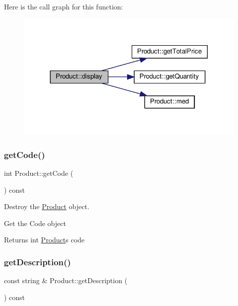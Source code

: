 Here is the call graph for this function\+:\nopagebreak
\begin{figure}[H]
\begin{center}
\leavevmode
\includegraphics[width=317pt]{classProduct_a2f411b12652a6b7b6194fcdbab3a1fb3_cgraph}
\end{center}
\end{figure}
\mbox{\label{classProduct_ada9a32ed7891875b3ccd8e064aad6492}} 
\subsubsection{\texorpdfstring{get\+Code()}{getCode()}}
{\footnotesize\ttfamily int Product\+::get\+Code (\begin{DoxyParamCaption}{ }\end{DoxyParamCaption}) const}



Destroy the \hyperlink{classProduct}{Product} object. 

Get the Code object

\begin{DoxyReturn}{Returns}
int \hyperlink{classProduct}{Product}\textquotesingle{}s code 
\end{DoxyReturn}
\mbox{\label{classProduct_afffde8c14c3bca709543cea274d67e7c}} 
\subsubsection{\texorpdfstring{get\+Description()}{getDescription()}}
{\footnotesize\ttfamily const string \& Product\+::get\+Description (\begin{DoxyParamCaption}{ }\end{DoxyParamCaption}) const}




